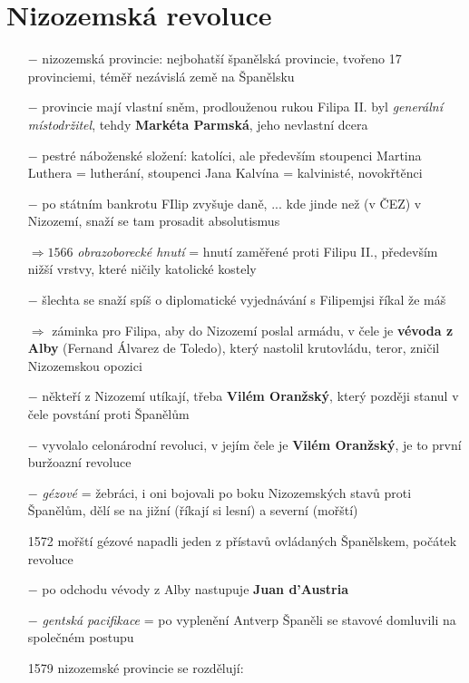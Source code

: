 \documentclass{article}
\begin{document}
\section*{Nizozemská revoluce}
\begin{itemize}
    \vspace{-0.5em}
    \setlength\itemsep{0.15em}
    \item[$-$] nizozemská provincie: nejbohatší španělská provincie, tvořeno 17 provinciemi, téměř nezávislá země na Španělsku
    \item[$-$] provincie mají vlastní sněm, prodlouženou rukou Filipa II. byl \textit{generální místodržitel}, tehdy \textbf{Markéta Parmská}, jeho nevlastní dcera
    \item[$-$] pestré náboženské složení: katolíci, ale především stoupenci Martina Luthera = lutherání, stoupenci Jana Kalvína = kalvinisté, novokřtěnci
    \item[$-$] po státním bankrotu FIlip zvyšuje daně, ... kde jinde než (v ČEZ) v Nizozemí, snaží se tam prosadit absolutismus
    \item[$\Rightarrow 1566$] \textit{obrazoborecké hnutí} = hnutí zaměřené proti Filipu II., především nižší vrstvy, které ničily katolické kostely
    \item[$-$] šlechta se snaží spíš o diplomatické vyjednávání s Filipemjsi říkal že máš
    \item[$\Rightarrow$] záminka pro Filipa, aby do Nizozemí poslal armádu, v čele je \textbf{vévoda z Alby} (Fernand Álvarez de Toledo), který nastolil krutovládu, teror, zničil Nizozemskou opozici
    \item[$-$] někteří z Nizozemí utíkají, třeba \textbf{Vilém Oranžský}, který později stanul v čele povstání proti Španělům
    \item[$-$]  vyvolalo celonárodní revoluci, v jejím čele je \textbf{Vilém Oranžský}, je to první buržoazní revoluce
    \item[$-$] \textit{gézové} = žebráci, i oni bojovali po boku Nizozemských stavů proti Španělům, dělí se na jižní (říkají si lesní) a severní (mořští)
    \item[1572] mořští gézové napadli jeden z přístavů ovládaných Španělskem, počátek revoluce
    \item[$-$] po odchodu vévody z Alby nastupuje \textbf{Juan d'Austria}
    \item[$-$] \textit{gentská pacifikace} = po vyplenění Antverp Španěli se stavové domluvili na společném postupu
    \item[1579] nizozemské provincie se rozdělují:

\end{itemize}
\end{document}
